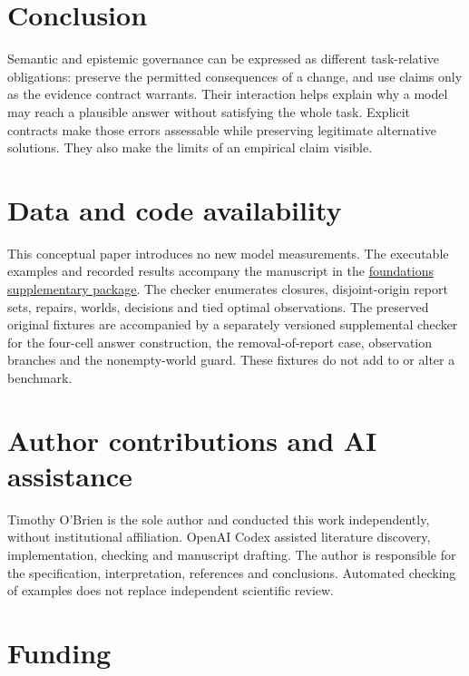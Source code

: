 \documentclass[a4paper,preprint,12pt,numbers,nopreprintline]{elsarticle}
\begin{document}
\section{Conclusion}

Semantic and epistemic governance can be expressed as different task-relative obligations: preserve the permitted consequences of a change, and use claims only as the evidence contract warrants. Their interaction helps explain why a model may reach a plausible answer without satisfying the whole task. Explicit contracts make those errors assessable while preserving legitimate alternative solutions. They also make the limits of an empirical claim visible.

\section*{Data and code availability}\label{data-and-code-availability}

This conceptual paper introduces no new model measurements. The executable examples and recorded results accompany the manuscript in the \href{https://github.com/prosessleder/semantic-epistemic-governance-foundations-preprint}{foundations supplementary package}. The checker enumerates closures, disjoint-origin report sets, repairs, worlds, decisions and tied optimal observations. The preserved original fixtures are accompanied by a separately versioned supplemental checker for the four-cell answer construction, the removal-of-report case, observation branches and the nonempty-world guard. These fixtures do not add to or alter a benchmark.

\section*{Author contributions and AI assistance}\label{author-contributions-and-ai-assistance}

Timothy O'Brien is the sole author and conducted this work independently, without institutional affiliation. OpenAI Codex assisted literature discovery, implementation, checking and manuscript drafting. The author is responsible for the specification, interpretation, references and conclusions. Automated checking of examples does not replace independent scientific review.

\section*{Funding}\label{funding}
\end{document}
